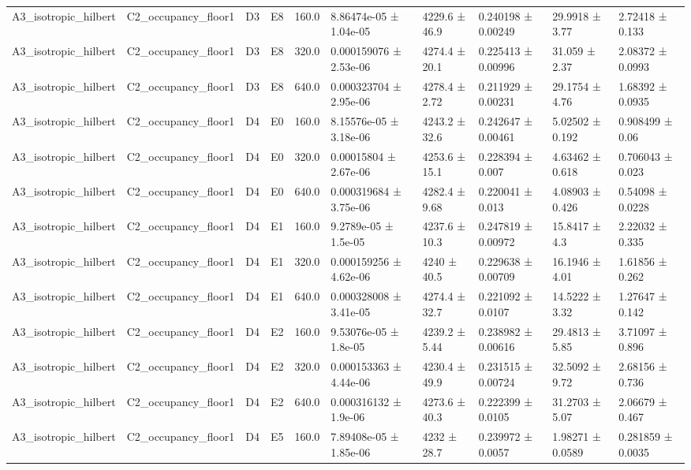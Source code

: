 \begin{table}
\begin{tabular}{llllllllll}
A3\_isotropic\_hilbert & C2\_occupancy\_floor1 & D3 & E8 & 160.0 & 8.86474e-05 ± 1.04e-05 & 4229.6 ± 46.9 & 0.240198 ± 0.00249 & 29.9918 ± 3.77 & 2.72418 ± 0.133 \\
A3\_isotropic\_hilbert & C2\_occupancy\_floor1 & D3 & E8 & 320.0 & 0.000159076 ± 2.53e-06 & 4274.4 ± 20.1 & 0.225413 ± 0.00996 & 31.059 ± 2.37 & 2.08372 ± 0.0993 \\
A3\_isotropic\_hilbert & C2\_occupancy\_floor1 & D3 & E8 & 640.0 & 0.000323704 ± 2.95e-06 & 4278.4 ± 2.72 & 0.211929 ± 0.00231 & 29.1754 ± 4.76 & 1.68392 ± 0.0935 \\
A3\_isotropic\_hilbert & C2\_occupancy\_floor1 & D4 & E0 & 160.0 & 8.15576e-05 ± 3.18e-06 & 4243.2 ± 32.6 & 0.242647 ± 0.00461 & 5.02502 ± 0.192 & 0.908499 ± 0.06 \\
A3\_isotropic\_hilbert & C2\_occupancy\_floor1 & D4 & E0 & 320.0 & 0.00015804 ± 2.67e-06 & 4253.6 ± 15.1 & 0.228394 ± 0.007 & 4.63462 ± 0.618 & 0.706043 ± 0.023 \\
A3\_isotropic\_hilbert & C2\_occupancy\_floor1 & D4 & E0 & 640.0 & 0.000319684 ± 3.75e-06 & 4282.4 ± 9.68 & 0.220041 ± 0.013 & 4.08903 ± 0.426 & 0.54098 ± 0.0228 \\
A3\_isotropic\_hilbert & C2\_occupancy\_floor1 & D4 & E1 & 160.0 & 9.2789e-05 ± 1.5e-05 & 4237.6 ± 10.3 & 0.247819 ± 0.00972 & 15.8417 ± 4.3 & 2.22032 ± 0.335 \\
A3\_isotropic\_hilbert & C2\_occupancy\_floor1 & D4 & E1 & 320.0 & 0.000159256 ± 4.62e-06 & 4240 ± 40.5 & 0.229638 ± 0.00709 & 16.1946 ± 4.01 & 1.61856 ± 0.262 \\
A3\_isotropic\_hilbert & C2\_occupancy\_floor1 & D4 & E1 & 640.0 & 0.000328008 ± 3.41e-05 & 4274.4 ± 32.7 & 0.221092 ± 0.0107 & 14.5222 ± 3.32 & 1.27647 ± 0.142 \\
A3\_isotropic\_hilbert & C2\_occupancy\_floor1 & D4 & E2 & 160.0 & 9.53076e-05 ± 1.8e-05 & 4239.2 ± 5.44 & 0.238982 ± 0.00616 & 29.4813 ± 5.85 & 3.71097 ± 0.896 \\
A3\_isotropic\_hilbert & C2\_occupancy\_floor1 & D4 & E2 & 320.0 & 0.000153363 ± 4.44e-06 & 4230.4 ± 49.9 & 0.231515 ± 0.00724 & 32.5092 ± 9.72 & 2.68156 ± 0.736 \\
A3\_isotropic\_hilbert & C2\_occupancy\_floor1 & D4 & E2 & 640.0 & 0.000316132 ± 1.9e-06 & 4273.6 ± 40.3 & 0.222399 ± 0.0105 & 31.2703 ± 5.07 & 2.06679 ± 0.467 \\
A3\_isotropic\_hilbert & C2\_occupancy\_floor1 & D4 & E5 & 160.0 & 7.89408e-05 ± 1.85e-06 & 4232 ± 28.7 & 0.239972 ± 0.0057 & 1.98271 ± 0.0589 & 0.281859 ± 0.0035 \\

\end{tabular}
\end{table}
